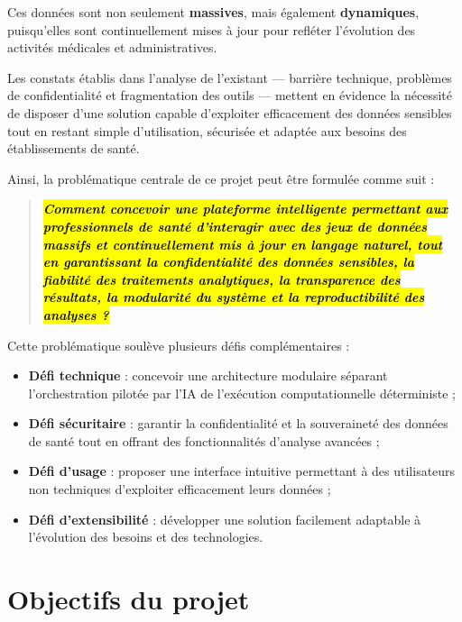 Ces données sont non seulement \textbf{massives}, mais également \textbf{dynamiques}, puisqu'elles sont continuellement mises à jour pour refléter l'évolution des activités médicales et administratives.

Les constats établis dans l'analyse de l'existant — barrière technique, problèmes de confidentialité et fragmentation des outils — mettent en évidence la nécessité de disposer d'une solution capable d'exploiter efficacement des données sensibles tout en restant simple d'utilisation, sécurisée et adaptée aux besoins des établissements de santé.

Ainsi, la problématique centrale de ce projet peut être formulée comme suit :

\begin{quote}
\itshape
\small
\textbf{\hl{Comment concevoir une plateforme intelligente permettant aux professionnels de santé d'interagir avec des jeux de données massifs et continuellement mis à jour en langage naturel, tout en garantissant la confidentialité des données sensibles, la fiabilité des traitements analytiques, la transparence des résultats, la modularité du système et la reproductibilité des analyses ?}}
\end{quote}

Cette problématique soulève plusieurs défis complémentaires :

\begin{itemize}
  \item \textbf{Défi technique} : concevoir une architecture modulaire séparant l'orchestration pilotée par l'IA de l'exécution computationnelle déterministe ;
  \item \textbf{Défi sécuritaire} : garantir la confidentialité et la souveraineté des données de santé tout en offrant des fonctionnalités d'analyse avancées ;
  \item \textbf{Défi d'usage} : proposer une interface intuitive permettant à des utilisateurs non techniques d'exploiter efficacement leurs données ;
  \item \textbf{Défi d'extensibilité} : développer une solution facilement adaptable à l'évolution des besoins et des technologies.
\end{itemize}

\section{Objectifs du projet}


